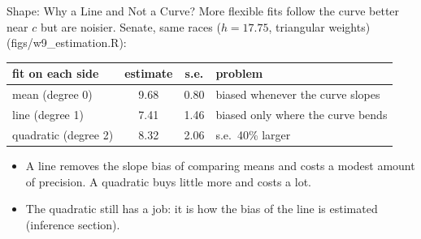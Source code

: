 \documentclass[aspectratio=169,11pt,xcolor=dvipsnames]{beamer}
\newcommand{\srcp}[1]{{\scriptsize\color{gray}(#1)}}
\begin{document}
\begin{frame}{Shape: Why a Line and Not a Curve?}
More flexible fits follow the curve better near $c$ but are noisier. Senate,
same races ($h = 17.75$, triangular weights) \srcp{figs/w9\_estimation.R}:
\vskip3pt
\begin{center}\small
\renewcommand{\arraystretch}{1.12}
\begin{tabular}{@{}lccl@{}}
\toprule
fit on each side & estimate & s.e. & problem \\
\midrule
mean (degree 0) & 9.68 & 0.80 & biased whenever the curve slopes \\
\alert{line (degree 1)} & \alert{7.41} & \alert{1.46} & biased only where the curve bends \\
quadratic (degree 2) & 8.32 & 2.06 & s.e.\ 40\% larger \\
\bottomrule
\end{tabular}
\end{center}
\vskip4pt
\begin{itemize}\itemsep3pt
  \item A line removes the slope bias of comparing means and costs a modest
        amount of precision. A quadratic buys little more and costs a lot.
  \item The quadratic still has a job: it is how the bias of the line is
        estimated (inference section).
\end{itemize}
\end{frame}
\end{document}
